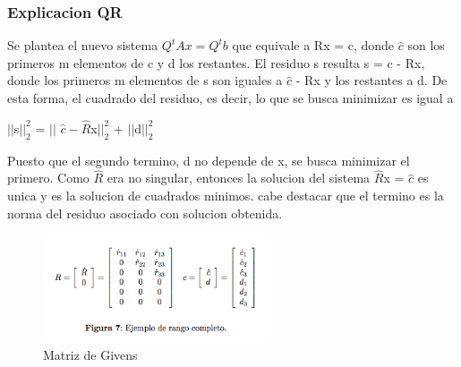 \subsubsection{Explicacion  QR}
Se plantea el nuevo sistema $Q^t A x = Q^t b$ que equivale a Rx = c, donde $\hat{c}$ son los primeros m elementos de c y d los restantes. El residuo s resulta s = c - Rx, donde los primeros m elementos de s son iguales a $\hat{c}$ - Rx y los restantes a d. De esta forma, el cuadrado del residuo, es decir, lo que se busca minimizar es igual a 

\begin{center}
$||$s$||^2_2$ = $||$ $\hat{c} - \hat{R}$x$||^2_2$ + $||$d$||^2_2$
\end{center}

Puesto que el segundo termino, d no depende de x, se busca minimizar el primero. Como $\hat{R}$ era no singular, entonces la solucion del sistema $\hat{R}$x = $\hat{c}$ es unica y es la solucion de cuadrados minimos. cabe destacar que el termino es la norma del residuo asociado con solucion obtenida.

\begin{figure}[H] 
\begin{center}
\includegraphics[width=0.6\textwidth]{img/exp-qr.png} 
\caption{Matriz de Givens} 
\end{center}
\end{figure}
